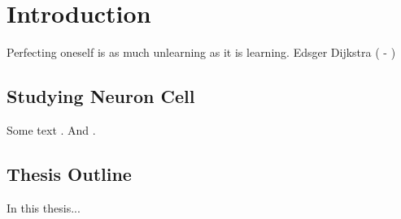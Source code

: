 %
%
\chpos{22mm}{10mm}
\chapter[Introduction]{Introduction}
\label{ch1:introduction}

{Perfecting oneself is as much unlearning as it is learning.}
{Edsger Dijkstra ( - )}


\section{Studying Neuron Cell} 
Some text \cite{abramoff2004image}. And \cite{ascolitrees}.


\section{Thesis Outline}
In this thesis... 
